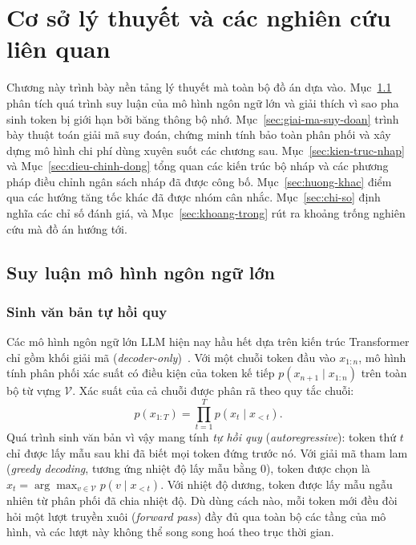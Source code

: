 \chapter{Cơ sở lý thuyết và các nghiên cứu liên quan}
\label{chap:tong-quan}

Chương này trình bày nền tảng lý thuyết mà toàn bộ đồ án dựa vào. Mục~\ref{sec:suy-luan-llm} phân tích quá trình suy luận của mô hình ngôn ngữ lớn và giải thích vì sao pha sinh token bị giới hạn bởi băng thông bộ nhớ. Mục~\ref{sec:giai-ma-suy-doan} trình bày thuật toán giải mã suy đoán, chứng minh tính bảo toàn phân phối và xây dựng mô hình chi phí dùng xuyên suốt các chương sau. Mục~\ref{sec:kien-truc-nhap} và Mục~\ref{sec:dieu-chinh-dong} tổng quan các kiến trúc bộ nháp và các phương pháp điều chỉnh ngân sách nháp đã được công bố. Mục~\ref{sec:huong-khac} điểm qua các hướng tăng tốc khác đã được nhóm cân nhắc. Mục~\ref{sec:chi-so} định nghĩa các chỉ số đánh giá, và Mục~\ref{sec:khoang-trong} rút ra khoảng trống nghiên cứu mà đồ án hướng tới.

\section{Suy luận mô hình ngôn ngữ lớn}
\label{sec:suy-luan-llm}

\subsection{Sinh văn bản tự hồi quy}

Các mô hình ngôn ngữ lớn LLM hiện nay hầu hết dựa trên kiến trúc Transformer chỉ gồm khối giải mã (\textit{decoder-only})~\cite{vaswani2017attention}. Với một chuỗi token đầu vào $x_{1:n}$, mô hình tính phân phối xác suất có điều kiện của token kế tiếp $p(x_{n+1}\mid x_{1:n})$ trên toàn bộ từ vựng $\mathcal{V}$. Xác suất của cả chuỗi được phân rã theo quy tắc chuỗi:
\begin{equation}\label{eq:tu-hoi-quy}
  p(x_{1:T}) = \prod_{t=1}^{T} p(x_t \mid x_{<t}).
\end{equation}
Quá trình sinh văn bản vì vậy mang tính \textit{tự hồi quy} (\textit{autoregressive}): token thứ $t$ chỉ được lấy mẫu sau khi đã biết mọi token đứng trước nó. Với giải mã tham lam (\textit{greedy decoding}, tương ứng nhiệt độ lấy mẫu bằng 0), token được chọn là $x_t = \arg\max_{v\in\mathcal{V}} p(v \mid x_{<t})$. Với nhiệt độ dương, token được lấy mẫu ngẫu nhiên từ phân phối đã chia nhiệt độ. Dù dùng cách nào, mỗi token mới đều đòi hỏi một lượt truyền xuôi (\textit{forward pass}) đầy đủ qua toàn bộ các tầng của mô hình, và các lượt này không thể song song hoá theo trục thời gian.

